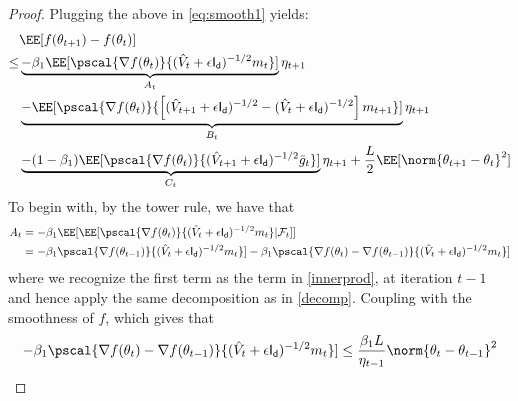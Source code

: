 \documentclass[11pt]{article}
\begin{document}
\begin{proof}
Plugging the above in \eqref{eq:smooth1} yields:
\begin{equation}\label{eq:main1}
\begin{split}
&\EE[f(\theta_{t+1}) - f(\theta_{t}) ] \\
\leq & \underbrace{- \beta_1\EE[ \pscal{\nabla f(\theta_t)}{(\hat{V}_{t} + \epsilon \mathsf{I_d})^{-1/2} m_{t}}]}_{A_t} \eta_{t+1}\\
& \underbrace{-  \EE[\pscal{\nabla f(\theta_t)}{\left[(\hat{V}_{t+1} + \epsilon \mathsf{I_d})^{-1/2} - (\hat{V}_{t} + \epsilon \mathsf{I_d})^{-1/2}  \right]m_{t+1}}]}_{B_t}\eta_{t+1}\\
& \underbrace{-  (1-\beta_1) \EE[\pscal{\nabla f(\theta_t)}{(\hat{V}_{t+1} + \epsilon \mathsf{I_d})^{-1/2} \bar{g}_t}]}_{C_t} \eta_{t+1}+ \frac{L}{2} \EE[\norm{\theta_{t+1} - \theta_{t}}^2]
\end{split}
\end{equation}
To begin with, by the tower rule, we have that 
\begin{align}
A_t & = - \beta_1\EE[\EE[\pscal{\nabla f(\theta_t)}{(\hat{V}_{t} + \epsilon \mathsf{I_d})^{-1/2} m_{t}}| \mathcal{F}_t]] \\
& = - \beta_1 \pscal{\nabla f(\theta_{t-1})}{(\hat{V}_{t} + \epsilon \mathsf{I_d})^{-1/2} m_{t}}] - \beta_1 \pscal{\nabla f(\theta_t) - \nabla f(\theta_{t-1})}{(\hat{V}_{t} + \epsilon \mathsf{I_d})^{-1/2} m_{t}}]\\
\end{align}
where we recognize the first term as the term in \eqref{innerprod}, at iteration $t-1$ and hence apply the same decomposition as in \eqref{decomp}.
Coupling with the smoothness of $f$, which gives that
$$
- \beta_1 \pscal{\nabla f(\theta_t) - \nabla f(\theta_{t-1})}{(\hat{V}_{t} + \epsilon \mathsf{I_d})^{-1/2} m_{t}}] \leq \frac{\beta_1 L}{\eta_{t-1}} \norm{\theta_t - \theta_{t-1}}^2
$$


\end{proof}
\end{document}
